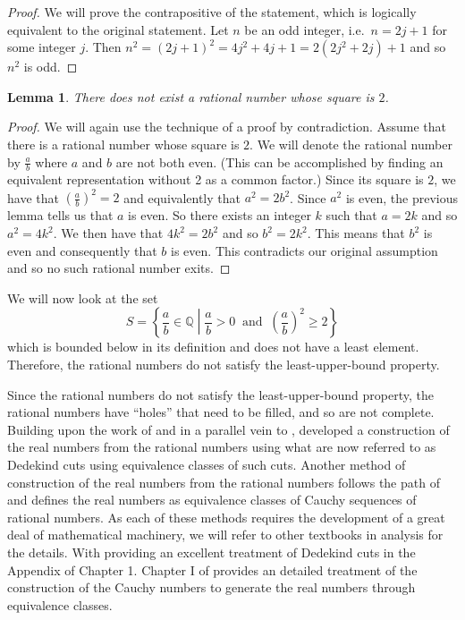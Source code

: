 \documentclass[
]{book}
\newtheorem{lemma}{Lemma}[chapter]
\theoremstyle{definition}
\theoremstyle{definition}
\theoremstyle{definition}
\theoremstyle{definition}
\theoremstyle{remark}
\begin{document}
\begin{proof}
We will prove the contrapositive of the statement, which is logically equivalent to the original statement. Let \(n\) be an odd integer, i.e.~\(n=2j+1\) for some integer \(j\). Then \(n^2=(2j+1)^2=4j^2+4j+1=2(2j^2+2j)+1\) and so \(n^2\) is odd.
\end{proof}

\begin{lemma}
There does not exist a rational number whose square is \(2\).
\end{lemma}

\begin{proof}
We will again use the technique of a proof by contradiction. Assume that there is a rational number whose square is \(2\). We will denote the rational number by \(\frac{a}{b}\) where \(a\) and \(b\) are not both even. (This can be accomplished by finding an equivalent representation without 2 as a common factor.) Since its square is \(2\), we have that \(\left(\frac{a}{b}\right)^2 =2\) and equivalently that \(a^2 = 2 b^2\). Since \(a^2\) is even, the previous lemma tells us that \(a\) is even. So there exists an integer \(k\) such that \(a=2k\) and so \(a^2=4k^2\). We then have that \(4k^2=2b^2\) and so \(b^2=2k^2\). This means that \(b^2\) is even and consequently that \(b\) is even. This contradicts our original assumption and so no such rational number exits.
\end{proof}

We will now look at the set
\[S = \left\{ \frac{a}{b}\in \mathbb{Q} \middle \vert \frac{a}{b} >0 \: \mbox{ and } \: \left(\frac{a}{b}\right)^2 \geq 2\right\}\] which is bounded below in its definition and does not have a least element. Therefore, the rational numbers do not satisfy the least-upper-bound property.

Since the rational numbers do not satisfy the least-upper-bound property, the rational numbers have ``holes'' that need to be filled, and so are not complete. Building upon the work of \citet{bertrand1840} and in a parallel vein to \citet{Heine1872}, \citet{Dedekind1872} developed a construction of the real numbers from the rational numbers using what are now referred to as Dedekind cuts using equivalence classes of such cuts. Another method of construction of the real numbers from the rational numbers follows the path of \citet{Cauchy1821} and defines the real numbers as equivalence classes of Cauchy sequences of rational numbers. As each of these methods requires the development of a great deal of mathematical machinery, we will refer to other textbooks in analysis for the details. With \citet{Rudin1976} providing an excellent treatment of Dedekind cuts in the Appendix of Chapter 1. Chapter I of \citet{Thurston1956} provides an detailed treatment of the construction of the Cauchy numbers to generate the real numbers through equivalence classes.
\end{document}
